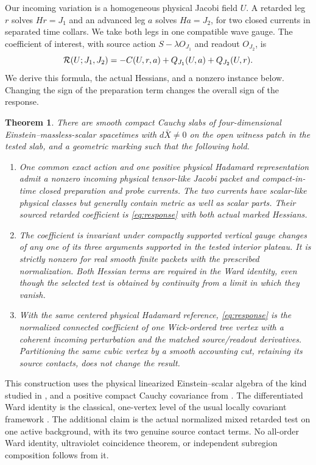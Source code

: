 \documentclass[11pt]{article}
\newtheorem{theorem}{Theorem}
\numberwithin{equation}{section}
\begin{document}
Our incoming variation is a homogeneous physical Jacobi field \(U\).
A retarded leg \(r\) solves \(Hr=J_1\) and an advanced leg \(a\)
solves \(Ha=J_2\), for two closed currents in separated time
collars. We take both legs in one compatible wave gauge.
The coefficient of interest, with source action \(S-\lambda O_{J_1}\)
and readout \(O_{J_2}\), is
\begin{equation}
 {\cal R}(U;J_1,J_2)
 =-C(U,r,a)+Q_{J_1}(U,a)+Q_{J_2}(U,r).
 \label{eq:response}
\end{equation}
We derive this formula, the actual Hessians, and a nonzero
instance below. Changing the sign of the preparation term
changes the overall sign of the response.

\begin{theorem}\label{thm:main}
There are smooth compact Cauchy slabs of four-dimensional
Einstein--massless-scalar spacetimes with \(d\bar X\ne0\) on the
open witness patch in the tested slab, and a geometric marking such that the following hold.
\begin{enumerate}
 \item One common exact action and one positive physical
 Hadamard representation admit a nonzero incoming physical
 tensor-like Jacobi packet and compact-in-time closed preparation
 and probe currents. The two currents have scalar-like physical
 classes but generally contain metric as well as scalar parts.
 Their sourced retarded coefficient is \eqref{eq:response}
 with both actual marked Hessians.
 \item The coefficient is invariant under compactly supported
 vertical gauge changes of any one of its three arguments
 supported in the tested interior plateau.
 It is strictly nonzero for real smooth finite packets with the
 prescribed normalization. Both Hessian terms are required in
 the Ward identity, even though the selected test is obtained
 by continuity from a limit in which they vanish.
 \item With the same centered physical Hadamard reference,
 \eqref{eq:response} is the normalized connected coefficient
 of one Wick-ordered tree vertex with a coherent incoming
 perturbation and the matched source/readout derivatives.
 Partitioning the same cubic vertex by a smooth accounting
 cut, retaining its source contacts, does not change the result.
\end{enumerate}
\end{theorem}

This construction uses the physical linearized Einstein--scalar
algebra of the kind studied in \cite{hack}, and a positive compact
Cauchy covariance from \cite{hadamard,modular}. The differentiated
Ward identity is the classical, one-vertex level of the usual
locally covariant framework \cite[Sec.~3.4]{bfr}. The additional
claim is the actual normalized mixed retarded test on one
active background, with its two genuine source contact terms.
No all-order Ward identity, ultraviolet coincidence theorem,
or independent subregion composition follows from it.
\end{document}
